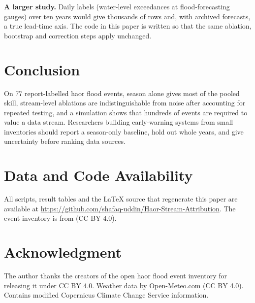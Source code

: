\textbf{A larger study.} Daily labels (water-level exceedances at flood-forecasting gauges) over ten years would give thousands of rows and, with archived forecasts, a true lead-time axis. The code in this paper is written so that the same ablation, bootstrap and correction steps apply unchanged.

\section{Conclusion}
On 77 report-labelled haor flood events, season alone gives most of the pooled skill, stream-level ablations are indistinguishable from noise after accounting for repeated testing, and a simulation shows that hundreds of events are required to value a data stream. Researchers building early-warning systems from small inventories should report a season-only baseline, hold out whole years, and give uncertainty before ranking data sources.

\section*{Data and Code Availability}
All scripts, result tables and the \LaTeX{} source that regenerate this paper are available at \url{https://github.com/shafaq-uddin/Haor-Stream-Attribution}. The event inventory is from \cite{koli2026dataset} (CC BY 4.0).

\section*{Acknowledgment}
The author thanks the creators of the open haor flood event inventory for releasing it under CC BY 4.0. Weather data by Open-Meteo.com (CC BY 4.0). Contains modified Copernicus Climate Change Service information.





